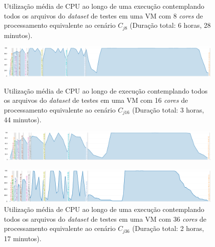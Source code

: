 \documentclass[english,brazilian]{UNISINOSmonografia} %
\begin{document}
\begin{figure}[btp]
	\centering%
	\begin{minipage}{\textwidth}
		\caption{Utilização média de CPU ao longo de uma execução contemplando todos os arquivos do \textit{dataset} de testes em uma VM com 8 \textit{cores} de processamento equivalente ao cenário $C_{j8}$ (Duração total: 6 horas, 28 minutos).}
		\label{fig:results-jmodel-eficiencia-8}
		\vspace{1ex}
		\includegraphics[width=\textwidth]{results-jmodel-eficiencia-8}
	\end{minipage}
	\begin{minipage}{\textwidth}
		\caption{Utilização média de CPU ao longo de execução contemplando todos os arquivos do \textit{dataset} de testes em uma VM com 16 \textit{cores} de processamento equivalente ao cenário $C_{j16}$ (Duração total: 3 horas, 44 minutos).}
		\label{fig:results-jmodel-eficiencia-16}
		\vspace{1ex}
		\includegraphics[width=\textwidth]{results-jmodel-eficiencia-16}
	\end{minipage}
	\begin{minipage}{\textwidth}
		\caption{Utilização média de CPU ao longo de uma execução contemplando todos os arquivos do \textit{dataset} de testes em uma VM com 36 \textit{cores} de processamento equivalente ao cenário $C_{j36}$ (Duração total: 2 horas, 17 minutos).}
		\label{fig:results-jmodel-eficiencia-36}
		\vspace{1ex}
		\includegraphics[width=\textwidth]{results-jmodel-eficiencia-36}
	\end{minipage}

\end{figure}
\end{document}
